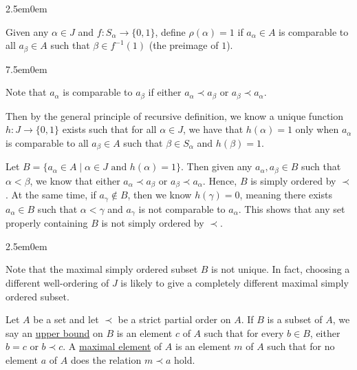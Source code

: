 \documentclass{book}
\newcommand{\myComment}{%
   \color{RawerSienna}%
   \fontsize{12}{14}\selectfont%
}
\newenvironment{myIndent}{%
   \begin{adjustwidth}{2.5em}{0em}%
}{%
   \end{adjustwidth}%
}
\newenvironment{myTindent}{%
   \begin{adjustwidth}{7.5em}{0em}%
}{%
   \end{adjustwidth}%
}
\newcommand{\udefine}[1]{{%
   \setulcolor{Red}%
   \setul{0.14em}{0.07em}%
   \ul{#1}%
}}
\newcommand{\retTwo}{\hfill\bigbreak}
\begin{document}
\begin{myIndent}
      Given any $\alpha \in J$ and $f: S_\alpha \longrightarrow \{0, 1\}$, define $\rho(\alpha) = 1$ if $a_\alpha \in A$ is comparable to all $a_\beta \in A$ such that $\beta \in f^{-1}(1)$ (the preimage of $1$).
      \begin{myTindent}\myComment
         Note that $a_\alpha$ is comparable to $a_\beta$ if either $a_\alpha \prec a_\beta$ or $a_\beta \prec a_\alpha$.\newpage
      \end{myTindent}

      Then by the general principle of recursive definition, we know a unique function $h: J \longrightarrow \{0, 1\}$ exists such that for all $\alpha \in J$, we have that $h(\alpha) = 1$ only when $a_\alpha$ is comparable to all $a_\beta \in A$ such that $\beta \in S_\alpha$ and $h(\beta) = 1$.\retTwo

      Let $B = \{a_\alpha \in A \mid \alpha \in J \text{ and } h(\alpha) = 1\}$. Then given any $a_\alpha, a_\beta \in B$ such that $\alpha < \beta$, we know that either $a_\alpha \prec a_\beta$ or $a_\beta \prec a_\alpha$. Hence, $B$ is simply ordered by $\prec$. At the same time, if $a_\gamma \notin B$, then we know $h(\gamma) = 0$, meaning there exists $a_\alpha \in B$ such that $\alpha < \gamma$ and  $a_\gamma$ is not comparable to $a_\alpha$. This shows that any set properly containing $B$ is not simply ordered by $\prec$.

      
      \begin{myIndent}\myComment
         Note that the maximal simply ordered subset $B$ is not unique. In fact, choosing a different well-ordering of $J$ is likely to give a completely different maximal simply ordered subset.\retTwo\retTwo
      \end{myIndent}
   \end{myIndent}

   Let $A$ be a set and let $\prec$ be a strict partial order on $A$. If $B$ is a subset of $A$, we say an \udefine{upper bound} on $B$ is an element $c$ of $A$ such that for every $b \in B$, either $b = c$ or $b \prec c$. A \udefine{maximal element} of $A$ is an element $m$ of $A$ such that for no element $a$ of $A$ does the relation $m \prec a$ hold.

   \newpage
\end{document}
